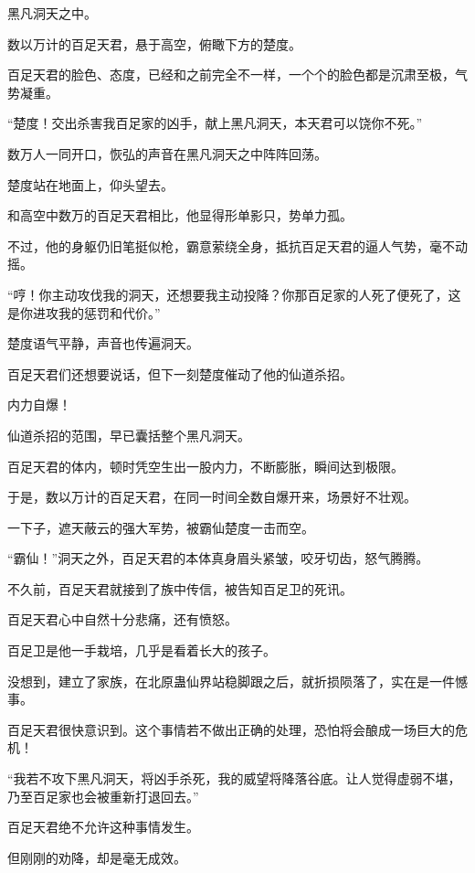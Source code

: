 
\begin{this_body}

黑凡洞天之中。

数以万计的百足天君，悬于高空，俯瞰下方的楚度。

百足天君的脸色、态度，已经和之前完全不一样，一个个的脸色都是沉肃至极，气势凝重。

“楚度！交出杀害我百足家的凶手，献上黑凡洞天，本天君可以饶你不死。”

数万人一同开口，恢弘的声音在黑凡洞天之中阵阵回荡。

楚度站在地面上，仰头望去。

和高空中数万的百足天君相比，他显得形单影只，势单力孤。

不过，他的身躯仍旧笔挺似枪，霸意萦绕全身，抵抗百足天君的逼人气势，毫不动摇。

“哼！你主动攻伐我的洞天，还想要我主动投降？你那百足家的人死了便死了，这是你进攻我的惩罚和代价。”

楚度语气平静，声音也传遍洞天。

百足天君们还想要说话，但下一刻楚度催动了他的仙道杀招。

内力自爆！

仙道杀招的范围，早已囊括整个黑凡洞天。

百足天君的体内，顿时凭空生出一股内力，不断膨胀，瞬间达到极限。

于是，数以万计的百足天君，在同一时间全数自爆开来，场景好不壮观。

一下子，遮天蔽云的强大军势，被霸仙楚度一击而空。

“霸仙！”洞天之外，百足天君的本体真身眉头紧皱，咬牙切齿，怒气腾腾。

不久前，百足天君就接到了族中传信，被告知百足卫的死讯。

百足天君心中自然十分悲痛，还有愤怒。

百足卫是他一手栽培，几乎是看着长大的孩子。

没想到，建立了家族，在北原蛊仙界站稳脚跟之后，就折损陨落了，实在是一件憾事。

百足天君很快意识到。这个事情若不做出正确的处理，恐怕将会酿成一场巨大的危机！

“我若不攻下黑凡洞天，将凶手杀死，我的威望将降落谷底。让人觉得虚弱不堪，乃至百足家也会被重新打退回去。”

百足天君绝不允许这种事情发生。

但刚刚的劝降，却是毫无成效。


\end{this_body}
